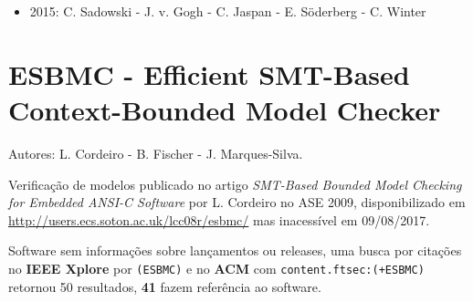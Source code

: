\begin{itemize}
\item 2015: C. Sadowski - J. v. Gogh - C. Jaspan - E. Söderberg - C. Winter
\end{itemize}

\section{ESBMC - Efficient SMT-Based Context-Bounded Model Checker}

Autores:
L. Cordeiro - B. Fischer - J. Marques-Silva.

Verificação de modelos
publicado no artigo {\it SMT-Based Bounded Model Checking for Embedded ANSI-C Software}
por L. Cordeiro
no ASE 2009,
disponibilizado em \url{http://users.ecs.soton.ac.uk/lcc08r/esbmc/}
mas inacessível em 09/08/2017.

Software sem informações sobre lançamentos ou releases,
uma busca por citações no {\bf IEEE Xplore} por
\texttt{(ESBMC)}
e no {\bf ACM} com
\texttt{content.ftsec:(+ESBMC)}
retornou
50 resultados,
{\bf 41} fazem referência ao software.

